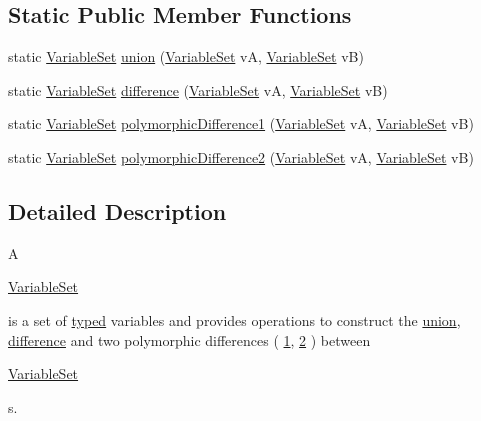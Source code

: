 \subsection*{Static Public Member Functions}
\begin{DoxyCompactItemize}
\item 
static \hyperlink{classorg_1_1tzi_1_1use_1_1util_1_1soil_1_1_variable_set}{Variable\-Set} \hyperlink{classorg_1_1tzi_1_1use_1_1util_1_1soil_1_1_variable_set_ac20bdac5494303ca59de0940bb08b3d4}{union} (\hyperlink{classorg_1_1tzi_1_1use_1_1util_1_1soil_1_1_variable_set}{Variable\-Set} v\-A, \hyperlink{classorg_1_1tzi_1_1use_1_1util_1_1soil_1_1_variable_set}{Variable\-Set} v\-B)
\item 
static \hyperlink{classorg_1_1tzi_1_1use_1_1util_1_1soil_1_1_variable_set}{Variable\-Set} \hyperlink{classorg_1_1tzi_1_1use_1_1util_1_1soil_1_1_variable_set_ad4472b0ec92101888b94dac8efb2ab38}{difference} (\hyperlink{classorg_1_1tzi_1_1use_1_1util_1_1soil_1_1_variable_set}{Variable\-Set} v\-A, \hyperlink{classorg_1_1tzi_1_1use_1_1util_1_1soil_1_1_variable_set}{Variable\-Set} v\-B)
\item 
static \hyperlink{classorg_1_1tzi_1_1use_1_1util_1_1soil_1_1_variable_set}{Variable\-Set} \hyperlink{classorg_1_1tzi_1_1use_1_1util_1_1soil_1_1_variable_set_a5a08cffcbe1240b16f13b267a892c90c}{polymorphic\-Difference1} (\hyperlink{classorg_1_1tzi_1_1use_1_1util_1_1soil_1_1_variable_set}{Variable\-Set} v\-A, \hyperlink{classorg_1_1tzi_1_1use_1_1util_1_1soil_1_1_variable_set}{Variable\-Set} v\-B)
\item 
static \hyperlink{classorg_1_1tzi_1_1use_1_1util_1_1soil_1_1_variable_set}{Variable\-Set} \hyperlink{classorg_1_1tzi_1_1use_1_1util_1_1soil_1_1_variable_set_ae1f6ac0f9aae67f052193beb51cf7e11}{polymorphic\-Difference2} (\hyperlink{classorg_1_1tzi_1_1use_1_1util_1_1soil_1_1_variable_set}{Variable\-Set} v\-A, \hyperlink{classorg_1_1tzi_1_1use_1_1util_1_1soil_1_1_variable_set}{Variable\-Set} v\-B)
\end{DoxyCompactItemize}


\subsection{Detailed Description}
A
\begin{DoxyCode}
\hyperlink{classorg_1_1tzi_1_1use_1_1util_1_1soil_1_1_variable_set_af19b1a4fef2608e816d93efeb44d570c}{VariableSet} 
\end{DoxyCode}
 is a set of \hyperlink{}{typed} variables and provides operations to construct the \hyperlink{classorg_1_1tzi_1_1use_1_1util_1_1soil_1_1_variable_set_ad1488ddabedde9adfc39573e8be5dba6}{union}, \hyperlink{classorg_1_1tzi_1_1use_1_1util_1_1soil_1_1_variable_set_abe368407f75bd977a3ebac8edc910a04}{difference} and two polymorphic differences ( \hyperlink{classorg_1_1tzi_1_1use_1_1util_1_1soil_1_1_variable_set_a930eb0212d938177d5797078564a6fbc}{1}, \hyperlink{classorg_1_1tzi_1_1use_1_1util_1_1soil_1_1_variable_set_a856811f58dfa966c936eda560b79349e}{2} ) between
\begin{DoxyCode}
\hyperlink{classorg_1_1tzi_1_1use_1_1util_1_1soil_1_1_variable_set_af19b1a4fef2608e816d93efeb44d570c}{VariableSet} 
\end{DoxyCode}
 s.

